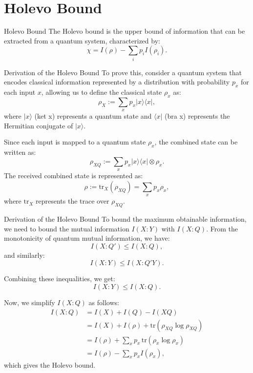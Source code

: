 \section{Holevo Bound}

\begin{frame}{Holevo Bound}
The Holevo bound is the upper bound of information that can be extracted from a quantum system, characterized by:
\[
\chi = I(\rho) - \sum_i p_i I(\rho_i).
\]
\end{frame}

\begin{frame}{Derivation of the Holevo Bound}
To prove this, consider a quantum system that encodes classical information represented by a distribution with probability \( p_x \) for each input \( x \), allowing us to define the classical state \( \rho_x \) as:
\[
\rho_X := \sum_x p_x |x\rangle \langle x|,
\]
where \( |x\rangle \) (ket x) represents a quantum state and \( \langle x| \) (bra x) represents the Hermitian conjugate of \( |x\rangle \).

Since each input is mapped to a quantum state \( \rho_x \), the combined state can be written as:
\[
\rho_{XQ} := \sum_x p_x |x\rangle \langle x| \otimes \rho_x.
\]
The received combined state is represented as:
\[
\rho := \text{tr}_X(\rho_{XQ}) = \sum_x p_x \rho_x,
\]
where \( \text{tr}_X \) represents the trace over \( \rho_{XQ} \).
\end{frame}

\begin{frame}{Derivation of the Holevo Bound}
To bound the maximum obtainable information, we need to bound the mutual information \( I(X : Y) \) with \( I(X : Q) \). From the monotonicity of quantum mutual information, we have:
\[
I(X : Q') \leq I(X : Q),
\]
and similarly:
\[
I(X : Y) \leq I(X : Q'Y).
\]

Combining these inequalities, we get:
\[
I(X : Y) \leq I(X : Q).
\]

Now, we simplify \( I(X : Q) \) as follows:
\begin{align*}
I(X : Q) &= I(X) + I(Q) - I(XQ) \\
         &= I(X) + I(\rho) + \text{tr}(\rho_{XQ} \log \rho_{XQ}) \\
         &= I(\rho) + \sum_x p_x \, \text{tr}(\rho_x \log \rho_x) \\
         &= I(\rho) - \sum_x p_x I(\rho_x),
\end{align*}
which gives the Holevo bound.
\end{frame}
